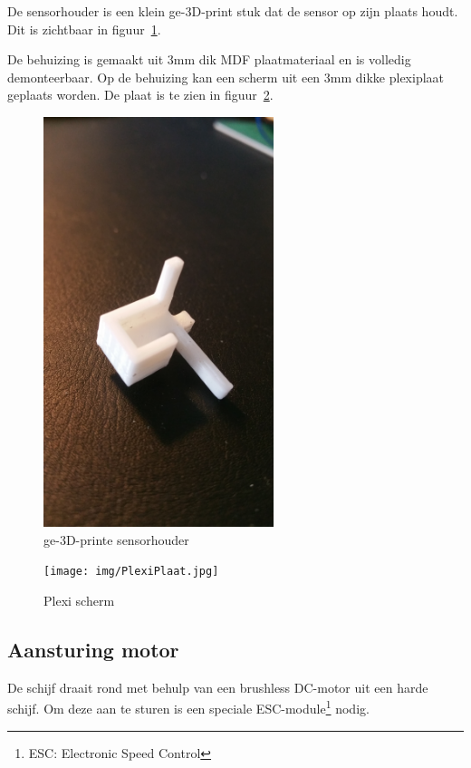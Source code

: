 \documentclass[12pt]{ugentreport}
\begin{document}
De sensorhouder is een klein ge-3D-print stuk dat de sensor op zijn plaats
houdt. Dit is zichtbaar in figuur~\ref{fig:sensorhouder}.

De behuizing is gemaakt uit 3mm dik MDF plaatmateriaal en is volledig demonteerbaar.
Op de behuizing kan een scherm uit een 3mm dikke plexiplaat geplaats worden. De plaat is te zien in figuur~\ref{fig:plexiplaat}.

\begin{figure}
  \centering
  \includegraphics[width=0.6\textwidth]{img/SensorHouder.jpg}
  \caption{ge-3D-printe sensorhouder}
  \label{fig:sensorhouder}
\end{figure}

\begin{figure}
  \centering
  \texttt{[image: img/PlexiPlaat.jpg]}
  \caption{Plexi scherm}
  \label{fig:plexiplaat}
\end{figure}

\subsection{Aansturing motor}
De schijf draait rond met behulp van een brushless DC-motor uit een harde schijf.
Om deze aan te sturen is een speciale ESC-module\footnote{ESC: Electronic Speed Control} nodig.
\end{document}

